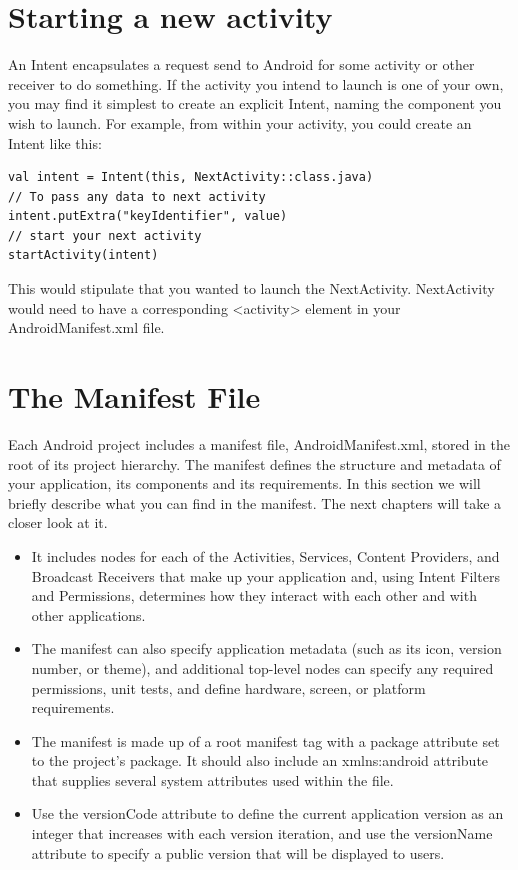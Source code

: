 



\section{Starting a new activity}
An Intent encapsulates a request send to Android for some activity or other receiver to do something.
If the activity you intend to launch is one of your own, you may find it simplest to create an explicit Intent, naming the component you wish to launch.
For example, from within your activity, you could create an Intent like this:

\begin{lstlisting}
val intent = Intent(this, NextActivity::class.java)
// To pass any data to next activity
intent.putExtra("keyIdentifier", value)
// start your next activity
startActivity(intent)
\end{lstlisting}

This would stipulate that you wanted to launch the NextActivity.
NextActivity would need to have a corresponding <activity> element in your AndroidManifest.xml file.

\section{The Manifest File}
Each Android project includes a manifest file, AndroidManifest.xml, stored in the root of its project hierarchy.
The manifest defines the structure and metadata of your application, its components and its requirements.
In this section we will briefly describe what you can find in the manifest.
The next chapters will take a closer look at it.

\begin{itemize}
	\item It includes nodes for each of the Activities, Services, Content Providers, and Broadcast Receivers that make up your application and, using Intent Filters and Permissions, determines how they interact with each other and with other applications.
	\item The manifest can also specify application metadata (such as its icon, version number, or theme), and additional top-level nodes can specify any required permissions, unit tests, and define hardware, screen, or platform requirements.
	\item The manifest is made up of a root manifest tag with a package attribute set to the project’s package.
		It should also include an xmlns:android attribute that supplies several system attributes used within the file.
	\item Use the versionCode attribute to define the current application version as an integer that increases with each version iteration, and use the versionName attribute to specify a public version that will be displayed to users.
\end{itemize}

